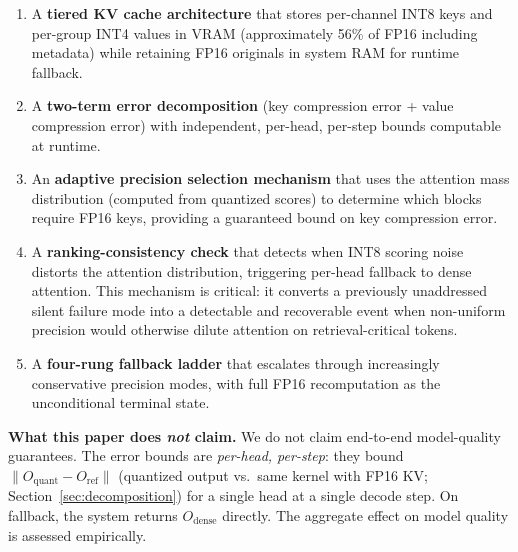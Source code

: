 \documentclass[10pt,twocolumn,a4paper]{article}
\theoremstyle{definition}
\theoremstyle{remark}
\newcommand{\norm}[1]{\lVert #1 \rVert}
\begin{document}
\begin{enumerate}[leftmargin=2em,itemsep=4pt]
  \item A \textbf{tiered KV cache architecture} that stores per-channel INT8 keys and per-group INT4 values in VRAM (approximately 56\% of FP16 including metadata) while retaining FP16 originals in system RAM for runtime fallback.

  \item A \textbf{two-term error decomposition} (key compression error + value compression error) with independent, per-head, per-step bounds computable at runtime.

  \item An \textbf{adaptive precision selection mechanism} that uses the attention mass distribution (computed from quantized scores) to determine which blocks require FP16 keys, providing a guaranteed bound on key compression error.

  \item A \textbf{ranking-consistency check} that detects when INT8 scoring noise distorts the attention distribution, triggering per-head fallback to dense attention.  This mechanism is critical: it converts a previously unaddressed silent failure mode into a detectable and recoverable event when non-uniform precision would otherwise dilute attention on retrieval-critical tokens.

  \item A \textbf{four-rung fallback ladder} that escalates through increasingly conservative precision modes, with full FP16 recomputation as the unconditional terminal state.
\end{enumerate}

\textbf{What this paper does \emph{not} claim.}  We do not claim end-to-end model-quality guarantees.  The error bounds are \emph{per-head, per-step}: they bound $\norm{O_{\mathrm{quant}} - O_{\mathrm{ref}}}$ (quantized output vs.\ same kernel with FP16 KV; Section~\ref{sec:decomposition}) for a single head at a single decode step.  On fallback, the system returns $O_{\mathrm{dense}}$ directly.  The aggregate effect on model quality is assessed empirically.
\end{document}
